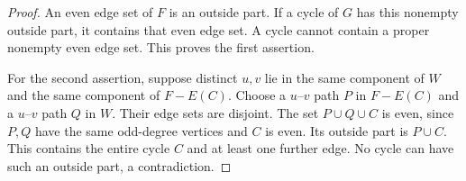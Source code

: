 \begin{proof}
An even edge set of $F$ is an outside part.
If a cycle of $G$ has this nonempty outside part, it contains that even edge set.
A cycle cannot contain a proper nonempty even edge set.
This proves the first assertion.

For the second assertion, suppose distinct $u,v$ lie in the same component of $W$ and the same component of $F-E(C)$.
Choose a $u$--$v$ path $P$ in $F-E(C)$ and a $u$--$v$ path $Q$ in $W$.
Their edge sets are disjoint.
The set $P\cup Q\cup C$ is even, since $P,Q$ have the same odd-degree vertices and $C$ is even.
Its outside part is $P\cup C$.
This contains the entire cycle $C$ and at least one further edge.
No cycle can have such an outside part, a contradiction.
\end{proof}

